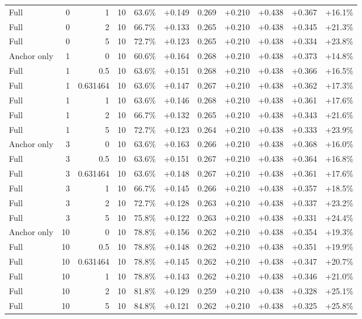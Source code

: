 \begin{table}[htbp]
\begin{tabular}{lrrrccccccc}
Full & 0 & 1 & 10 & 63.6\% & +0.149 & 0.269 & +0.210 & +0.438 & +0.367 & +16.1\% \\
Full & 0 & 2 & 10 & 66.7\% & +0.133 & 0.265 & +0.210 & +0.438 & +0.345 & +21.3\% \\
Full & 0 & 5 & 10 & 72.7\% & +0.123 & 0.265 & +0.210 & +0.438 & +0.334 & +23.8\% \\
Anchor only & 1 & 0 & 10 & 60.6\% & +0.164 & 0.268 & +0.210 & +0.438 & +0.373 & +14.8\% \\
Full & 1 & 0.5 & 10 & 63.6\% & +0.151 & 0.268 & +0.210 & +0.438 & +0.366 & +16.5\% \\
Full & 1 & 0.631464 & 10 & 63.6\% & +0.147 & 0.267 & +0.210 & +0.438 & +0.362 & +17.3\% \\
Full & 1 & 1 & 10 & 63.6\% & +0.146 & 0.268 & +0.210 & +0.438 & +0.361 & +17.6\% \\
Full & 1 & 2 & 10 & 66.7\% & +0.132 & 0.265 & +0.210 & +0.438 & +0.343 & +21.6\% \\
Full & 1 & 5 & 10 & 72.7\% & +0.123 & 0.264 & +0.210 & +0.438 & +0.333 & +23.9\% \\
Anchor only & 3 & 0 & 10 & 63.6\% & +0.163 & 0.266 & +0.210 & +0.438 & +0.368 & +16.0\% \\
Full & 3 & 0.5 & 10 & 63.6\% & +0.151 & 0.267 & +0.210 & +0.438 & +0.364 & +16.8\% \\
Full & 3 & 0.631464 & 10 & 63.6\% & +0.148 & 0.267 & +0.210 & +0.438 & +0.361 & +17.6\% \\
Full & 3 & 1 & 10 & 66.7\% & +0.145 & 0.266 & +0.210 & +0.438 & +0.357 & +18.5\% \\
Full & 3 & 2 & 10 & 72.7\% & +0.128 & 0.263 & +0.210 & +0.438 & +0.337 & +23.2\% \\
Full & 3 & 5 & 10 & 75.8\% & +0.122 & 0.263 & +0.210 & +0.438 & +0.331 & +24.4\% \\
Anchor only & 10 & 0 & 10 & 78.8\% & +0.156 & 0.262 & +0.210 & +0.438 & +0.354 & +19.3\% \\
Full & 10 & 0.5 & 10 & 78.8\% & +0.148 & 0.262 & +0.210 & +0.438 & +0.351 & +19.9\% \\
Full & 10 & 0.631464 & 10 & 78.8\% & +0.145 & 0.262 & +0.210 & +0.438 & +0.347 & +20.7\% \\
Full & 10 & 1 & 10 & 78.8\% & +0.143 & 0.262 & +0.210 & +0.438 & +0.346 & +21.0\% \\
Full & 10 & 2 & 10 & 81.8\% & +0.129 & 0.259 & +0.210 & +0.438 & +0.328 & +25.1\% \\
Full & 10 & 5 & 10 & 84.8\% & +0.121 & 0.262 & +0.210 & +0.438 & +0.325 & +25.8\% \\

\end{tabular}
\end{table}

